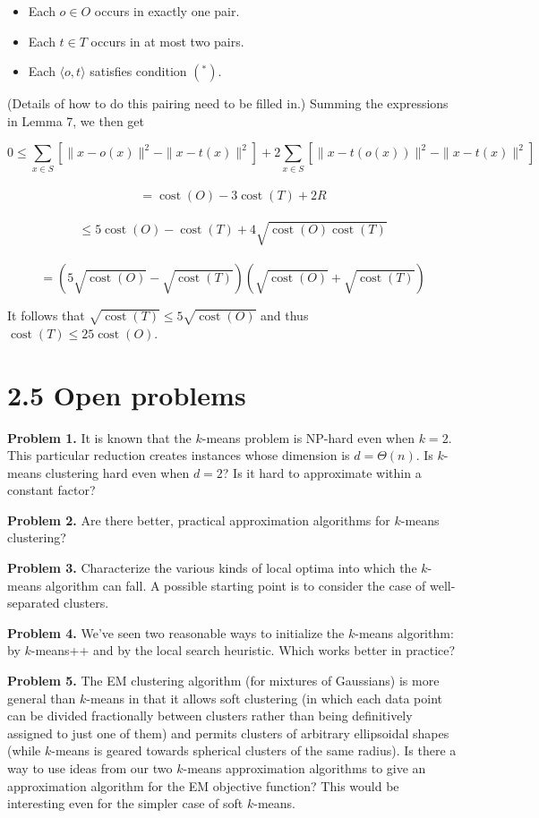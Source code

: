 \documentclass{article}
\begin{document}
\begin{itemize}
    \item Each $o \in O$ occurs in exactly one pair.
    \item Each $t \in T$ occurs in at most two pairs.
    \item Each $\langle o, t\rangle$ satisfies condition $\left(^{*}\right)$.
\end{itemize}

(Details of how to do this pairing need to be filled in.) Summing the expressions in Lemma 7, we then get


$$0  \leq \sum_{x \in S}\left[\|x-o(x)\|^{2}-\|x-t(x)\|^{2}\right]+2 \sum_{x \in S}\left[\|x-t(o(x))\|^{2}-\|x-t(x)\|^{2}\right]$$ \\
$$=\operatorname{cost}(O)-3 \operatorname{cost}(T)+2 R$$ \\
$$ \leq 5 \operatorname{cost}(O)-\operatorname{cost}(T)+4 \sqrt{\operatorname{cost}(O) \operatorname{cost}(T)}$$ \\
$$=\left(5 \sqrt{\operatorname{cost}(O)}-\sqrt{\operatorname{cost}(T)}\right)\left(\sqrt{\operatorname{cost}(O)}+\sqrt{\operatorname{cost}(T)}\right)$$


It follows that $\sqrt{\operatorname{cost}(T)} \leq 5 \sqrt{\operatorname{cost}(O)}$ and thus $\operatorname{cost}(T) \leq 25 \operatorname{cost}(O)$.

\section*{2.5 Open problems}

\textbf{Problem 1.} It is known that the $k$-means problem is NP-hard even when $k=2$. This particular reduction creates instances whose dimension is $d=\Theta(n)$. Is $k$-means clustering hard even when $d=2$? Is it hard to approximate within a constant factor?

\textbf{Problem 2.} Are there better, practical approximation algorithms for $k$-means clustering?

\textbf{Problem 3.} Characterize the various kinds of local optima into which the $k$-means algorithm can fall. A possible starting point is to consider the case of well-separated clusters.

\textbf{Problem 4.} We've seen two reasonable ways to initialize the $k$-means algorithm: by $k$-means++ and by the local search heuristic. Which works better in practice?

\textbf{Problem 5.} The EM clustering algorithm (for mixtures of Gaussians) is more general than $k$-means in that it allows soft clustering (in which each data point can be divided fractionally between clusters rather than being definitively assigned to just one of them) and permits clusters of arbitrary ellipsoidal shapes (while $k$-means is geared towards spherical clusters of the same radius). Is there a way to use ideas from our two $k$-means approximation algorithms to give an approximation algorithm for the EM objective function? This would be interesting even for the simpler case of soft $k$-means.
\end{document}
